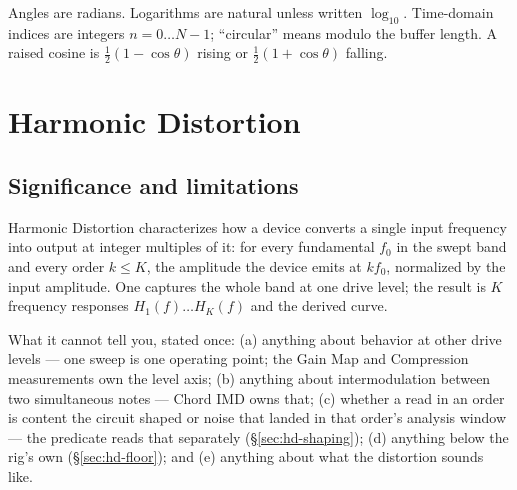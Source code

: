 \documentclass[11pt,a4paper]{article}
\begin{document}
Angles are radians. Logarithms are natural unless written $\log_{10}$.
Time-domain indices are integers $n = 0 \ldots N-1$; ``circular'' means
modulo the buffer length. A raised cosine is $\tfrac12(1 - \cos\theta)$
rising or $\tfrac12(1 + \cos\theta)$ falling.

\section{Harmonic Distortion}
\label{sec:hd}

\subsection{Significance and limitations}
Harmonic Distortion characterizes how a device converts a single input
frequency into output at integer multiples of it: for every fundamental
$f_0$ in the swept band and every order $k \le K$, the amplitude the device
emits at $k f_0$, normalized by the input amplitude. One 
captures the whole band at one drive level; the result is $K$ frequency
responses $H_1(f) \ldots H_K(f)$ and the derived  curve.

What it cannot tell you, stated once: (a) anything about behavior at other
drive levels --- one sweep is one operating point; the Gain Map and
Compression measurements own the level axis; (b) anything about intermodulation
between two simultaneous notes --- Chord IMD owns that; (c) whether a read
in an order is content the circuit shaped or noise that landed in that
order's analysis window --- the  predicate reads that
separately (\S\ref{sec:hd-shaping}); (d) anything below the rig's own
 (\S\ref{sec:hd-floor}); and (e) anything about what the
distortion sounds like.
\end{document}
